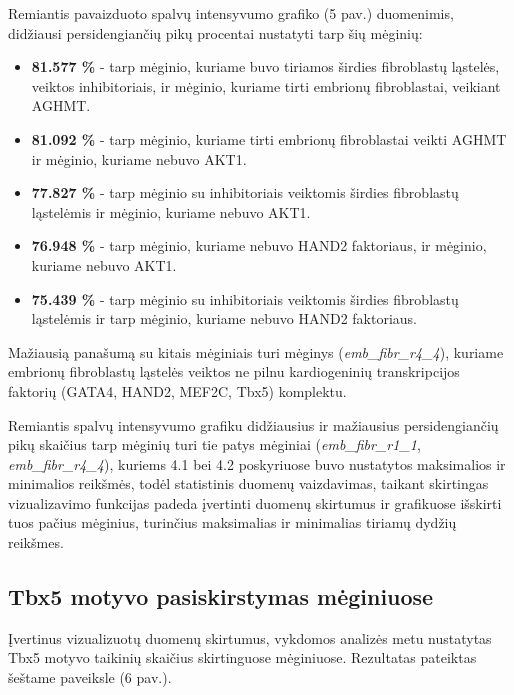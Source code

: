 \documentclass[12pt]{article}
\begin{document}
Remiantis pavaizduoto spalvų intensyvumo grafiko (5 pav.) duomenimis, didžiausi
persidengiančių pikų procentai nustatyti tarp šių mėginių:

\begin{itemize}
    \item \textbf{81.577 \%} - tarp mėginio, kuriame buvo tiriamos širdies
        fibroblastų ląstelės, veiktos inhibitoriais, ir mėginio, kuriame
        tirti embrionų fibroblastai, veikiant AGHMT.
    \item \textbf{81.092 \%} - tarp mėginio, kuriame tirti embrionų
        fibroblastai veikti AGHMT ir mėginio, kuriame nebuvo AKT1.
    \item \textbf{77.827 \%} - tarp mėginio su inhibitoriais veiktomis
        širdies fibroblastų ląstelėmis ir mėginio, kuriame nebuvo AKT1.
    \item \textbf{76.948 \%} - tarp mėginio, kuriame nebuvo HAND2 faktoriaus,
        ir mėginio, kuriame nebuvo AKT1.
    \item \textbf{75.439 \%} - tarp mėginio su inhibitoriais veiktomis
        širdies fibroblastų ląstelėmis ir tarp mėginio, kuriame nebuvo HAND2
        faktoriaus.
  \end{itemize}

Mažiausią panašumą su kitais mėginiais turi mėginys
(\small\emph{emb\_fibr\_r4\_4}), kuriame embrionų fibroblastų ląstelės
veiktos ne pilnu kardiogeninių transkripcijos faktorių (GATA4, HAND2, MEF2C,
Tbx5) komplektu.
\newpage

Remiantis spalvų intensyvumo grafiku didžiausius ir mažiausius persidengiančių
pikų skaičius tarp mėginių turi tie patys mėginiai
(\small\emph{emb\_fibr\_r1\_1}, \small\emph{emb\_fibr\_r4\_4}), kuriems 4.1 bei
4.2 poskyriuose buvo nustatytos maksimalios ir minimalios reikšmės, todėl
statistinis duomenų vaizdavimas, taikant skirtingas vizualizavimo funkcijas
padeda įvertinti duomenų skirtumus ir grafikuose išskirti tuos pačius
mėginius, turinčius maksimalias ir minimalias tiriamų dydžių reikšmes.


\subsection{Tbx5 motyvo pasiskirstymas mėginiuose}
Įvertinus vizualizuotų duomenų skirtumus, vykdomos analizės metu nustatytas
Tbx5 motyvo taikinių skaičius skirtinguose mėginiuose. Rezultatas pateiktas
šeštame paveiksle (6 pav.).
\end{document}
